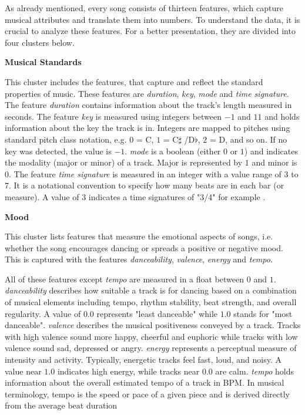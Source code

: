 As already mentioned, every song consists of thirteen features, which capture musical attributes and translate them into numbers.
To understand the data, it is crucial to analyze these features. For a better presentation, they are divided into four clusters below. 

\textbf{Musical Standards}

This cluster includes the features, that capture and reflect the standard properties of music. 
These features are \emph{duration}, \emph{key}, \emph{mode} and \emph{time signature}. 
The feature \emph{duration} contains information about the track's length measured in seconds.
The feature \emph{key} is measured using integers between \(-1\) and \(11\) and 
holds information about the key the track is in.
Integers are mapped to pitches using standard pitch class notation, e.g. \(0\) = C, \(1\) = C\(\sharp\) /D\(\flat\), \(2\) = D, and so on. 
If no key was detected, the value is \(-1\).
\emph{mode} is a boolean (either \(0\) or \(1\)) and indicates the modality (major or minor) of a track.
Major is represented by \(1\) and minor is \(0\). 
The feature \emph{time signature} is measured in an integer with a value range of \(3\) to \(7\).
It is a notational convention to specify how many beats are in each bar (or measure). 
A value of $3$ indicates a time signatures of "3/4" for example \cite[]{Features}.

\textbf{Mood}

This cluster lists features that measure the emotional aspects of songs, 
i.e. whether the song encourages dancing or spreads a positive or negative mood.
This is captured with the features \emph{danceability}, \emph{valence}, \emph{energy} and \emph{tempo}.

All of these features except \emph{tempo} are measured in a float between \(0\) and \(1\). 
\emph{danceability} describes how suitable a track is for dancing based on a combination of musical elements
including tempo, rhythm stability, beat strength, and overall regularity.
A value of \(0.0\) represents "least danceable" while $1.0$ stands for "most danceable".
\emph{valence} describes the musical positiveness conveyed by a track. 
Tracks with high valence sound more happy, cheerful and euphoric
while tracks with low valence sound sad, depressed or angry.
\emph{energy} represents a perceptual measure of intensity and activity.
Typically, energetic tracks feel fast, loud, and noisy. 
A value near \(1.0\) indicates high energy, while tracks near \(0.0\) are calm.
\emph{tempo} holds information about the overall estimated tempo of a track in \ac{BPM}.
In musical terminology, tempo is the speed or pace of a given piece and is derived directly from the
average beat duration \cite[]{Features}


